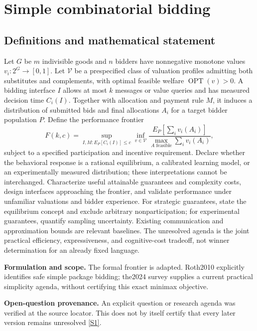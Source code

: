 \documentclass[11pt]{article}
\newcommand{\sref}[2]{\hyperlink{source:#1:#2}{[S#2]}}
\begin{document}
\section*{Simple combinatorial bidding}\label{30007576}
\subsection{Definitions and mathematical statement}
Let \(G\) be \(m\) indivisible goods and \(n\) bidders have nonnegative monotone values \(v_i:2^G\to[0,1]\). Let \(\mathcal V\) be a prespecified class of valuation profiles admitting both substitutes and complements, with optimal feasible welfare \(\operatorname{OPT}(v)>0\). A bidding interface \(I\) allows at most \(k\) messages or value queries and has measured decision time \(C_i(I)\). Together with allocation and payment rule \(M\), it induces a distribution of submitted bids and final allocations \(A_i\) for a target bidder population \(P\). Define the performance frontier
\[
 F(k,c)=\sup_{I,M:E_P[C_i(I)]\leq c}
 \inf_{v\in\mathcal V}\frac{E_P[\sum_i v_i(A_i)]}{\max_{A\text{ feasible}}\sum_i v_i(A_i)},
\]
subject to a specified participation and incentive requirement. Declare whether the behavioral response is a rational equilibrium, a calibrated learning model, or an experimentally measured distribution; these interpretations cannot be interchanged. Characterize useful attainable guarantees and complexity costs, design interfaces approaching the frontier, and validate performance under unfamiliar valuations and bidder experience. For strategic guarantees, state the equilibrium concept and exclude arbitrary nonparticipation; for experimental guarantees, quantify sampling uncertainty. Existing communication and approximation bounds are relevant baselines. The unresolved agenda is the joint practical efficiency, expressiveness, and cognitive-cost tradeoff, not winner determination for an already fixed language.

\par\textbf{Formulation and scope.} The formal frontier is adapted. Roth2010 explicitly identifies safe simple package bidding; the2024 survey supplies a current practical simplicity agenda, without certifying this exact minimax objective.

\par\textbf{Open-question provenance.} An explicit question or research agenda was verified at the source locator. This does not by itself certify that every later version remains unresolved \sref{30007576}{1}.
\end{document}
